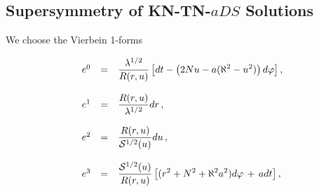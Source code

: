 \documentclass[12pt,a4paper]{article}
\begin{document}
\subsection{Supersymmetry of KN-TN-$aDS$ Solutions}

We choose the Vierbein 1-forms

\begin{equation}
\begin{array}{rcl}
e^{0} & = & {\displaystyle\frac{\lambda^{1/2}}{R(r,u)}
          \left[
             dt -\left(2Nu-a(\aleph^{2} -u^2)\right)d\varphi
          \right]} \, , \\
& & \\
e^{1} & = & 
{\displaystyle\frac{R(r,u)}{\lambda^{1/2}}dr} \, ,\\
& & \\
e^{2} & = & {\displaystyle\frac{ R(r,u)}{{\cal S}^{1/2}(u)}du} \, , \\
& &  \\
e^{3} & = & 
{\displaystyle\frac{{\cal S}^{1/2}(u)}{ R(r,u)}
\left[ (r^2+N^2+\aleph^{2} a^2)d\varphi \,+\, a dt \right]} \, ,
\end{array}
\label{eq:KNTNaDS4bein}
\end{equation}

%
%
\end{document}
